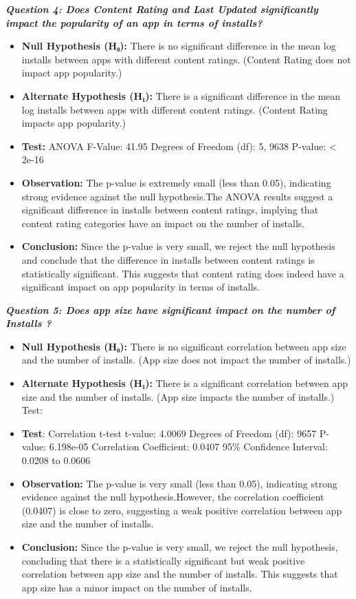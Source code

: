 \documentclass[
]{article}
\begin{document}
\textbf{\emph{Question 4: Does Content Rating and Last Updated
significantly impact the popularity of an app in terms of installs?}}

\begin{itemize}
\item
  \textbf{Null Hypothesis (H₀):} There is no significant difference in
  the mean log installs between apps with different content ratings.
  (Content Rating does not impact app popularity.)
\item
  \textbf{Alternate Hypothesis (H₁):} There is a significant difference
  in the mean log installs between apps with different content ratings.
  (Content Rating impacts app popularity.)
\item
  \textbf{Test:} ANOVA F-Value: 41.95 Degrees of Freedom (df): 5, 9638
  P-value: \textless{} 2e-16
\item
  \textbf{Observation:} The p-value is extremely small (less than 0.05),
  indicating strong evidence against the null hypothesis.The ANOVA
  results suggest a significant difference in installs between content
  ratings, implying that content rating categories have an impact on the
  number of installs.
\item
  \textbf{Conclusion:} Since the p-value is very small, we reject the
  null hypothesis and conclude that the difference in installs between
  content ratings is statistically significant. This suggests that
  content rating does indeed have a significant impact on app popularity
  in terms of installs.
\end{itemize}

\textbf{\emph{Question 5: Does app size have significant impact on the
number of Installs ?}}

\begin{itemize}
\item
  \textbf{Null Hypothesis (H₀):} There is no significant correlation
  between app size and the number of installs. (App size does not impact
  the number of installs.)
\item
  \textbf{Alternate Hypothesis (H₁):} There is a significant correlation
  between app size and the number of installs. (App size impacts the
  number of installs.) Test:
\item
  \textbf{Test}: Correlation t-test t-value: 4.0069 Degrees of Freedom
  (df): 9657 P-value: 6.198e-05 Correlation Coefficient: 0.0407 95\%
  Confidence Interval: 0.0208 to 0.0606
\item
  \textbf{Observation:} The p-value is very small (less than 0.05),
  indicating strong evidence against the null hypothesis.However, the
  correlation coefficient (0.0407) is close to zero, suggesting a weak
  positive correlation between app size and the number of installs.
\item
  \textbf{Conclusion:} Since the p-value is very small, we reject the
  null hypothesis, concluding that there is a statistically significant
  but weak positive correlation between app size and the number of
  installs. This suggests that app size has a minor impact on the number
  of installs.
\end{itemize}
\end{document}
